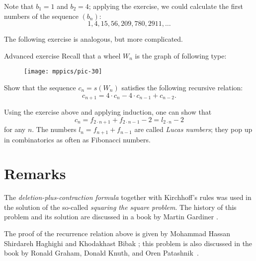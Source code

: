 Note that $b_1=1$ and $b_2=4$; applying the exercise, we could calculate the first numbers of the sequence $(b_n)$:
\[1,4,15,56,209,780,2911,\dots \]

The following exercise is analogous, but more complicated.

\begin{thm}{Advanced exercise}\label{ex:wheel}
Recall that a wheel $W_n$ is the graph of following type:

\begin{figure}[ht!]
\centering
\texttt{[image: mppics/pic-30]}
\end{figure}

Show that the sequence $c_n=s(W_n)$ satisfies the following recursive relation:
\[c_{n+1}=4\cdot c_n-4\cdot c_{n-1}+c_{n-2}.\]

\end{thm}

Using the exercise above and applying induction, one can show that 
\[c_n=f_{2\cdot n+1}+f_{2\cdot n-1}-2=l_{2\cdot  n}-2\]
for any $n$.
The numbers $l_n=f_{n+1}+f_{n-1}$ are called \emph{Lucas numbers};
they pop up in combinatorics as often as Fibonacci numbers.  

\section{Remarks}

The \textit{deletion-plus-contraction formula} together with Kirchhoff's rules was used in the solution of the so-called \emph{squaring the square problem}.
The history of this problem and its solution are discussed in a book by Martin Gardiner \cite[Chapter 17]{gardiner}.

The proof of the recurrence relation above is given by Mohammad Hassan Shirdareh Haghighi and Khodakhast Bibak \cite{shirdareh-haghighi-bibak};
this problem is also discussed in the book by Ronald Graham, Donald Knuth, and Oren Patashnik~\cite{graham-knuth-patashnik}.
